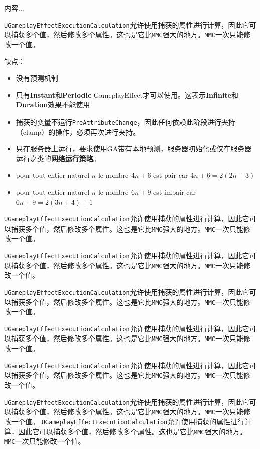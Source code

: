 \documentclass[10pt,a4paper,x11names,dvipsnames,svgnames,oneside]{ctexbook}
\begin{document}
\begin{expl}
	内容...

\texttt{UGameplayEffectExecutionCalculation}允许使用捕获的属性进行计算，因此它可以捕获多个值，然后修改多个属性。这也是它比\texttt{MMC}强大的地方。\texttt{MMC}一次只能修改一个值。

缺点：
\begin{itemize}
\item 没有预测机制
\item 只有\textbf{Instant}和\textbf{Periodic} GameplayEffect才可以使用。这表示\textbf{Infinite}和\textbf{Duration}效果不能使用
\item 捕获的变量不运行\texttt{PreAttributeChange}，因此任何依赖此阶段进行夹持（clamp）的操作，必须再次进行夹持。
\item 只在服务器上运行，要求使用GA带有本地预测，服务器初始化或仅在服务器运行之类的\textbf{网络运行策略}。
\end{itemize}

	\begin{itemize}
		\item  pour tout entier naturel $n$ le nombre $4n+6$ est pair car $4n+6=2(2n+3)$
		\item pour tout entier naturel $n$ le nombre $6n+9$ est impair car $6n+9=2(3n+4)+1$
	\end{itemize}
\texttt{UGameplayEffectExecutionCalculation}允许使用捕获的属性进行计算，因此它可以捕获多个值，然后修改多个属性。这也是它比\texttt{MMC}强大的地方。\texttt{MMC}一次只能修改一个值。


\texttt{UGameplayEffectExecutionCalculation}允许使用捕获的属性进行计算，因此它可以捕获多个值，然后修改多个属性。这也是它比\texttt{MMC}强大的地方。\texttt{MMC}一次只能修改一个值。


\texttt{UGameplayEffectExecutionCalculation}允许使用捕获的属性进行计算，因此它可以捕获多个值，然后修改多个属性。这也是它比\texttt{MMC}强大的地方。\texttt{MMC}一次只能修改一个值。


\texttt{UGameplayEffectExecutionCalculation}允许使用捕获的属性进行计算，因此它可以捕获多个值，然后修改多个属性。这也是它比\texttt{MMC}强大的地方。\texttt{MMC}一次只能修改一个值。


\texttt{UGameplayEffectExecutionCalculation}允许使用捕获的属性进行计算，因此它可以捕获多个值，然后修改多个属性。这也是它比\texttt{MMC}强大的地方。\texttt{MMC}一次只能修改一个值。


\texttt{UGameplayEffectExecutionCalculation}允许使用捕获的属性进行计算，因此它可以捕获多个值，然后修改多个属性。这也是它比\texttt{MMC}强大的地方。\texttt{MMC}一次只能修改一个值。	
\texttt{UGameplayEffectExecutionCalculation}允许使用捕获的属性进行计算，因此它可以捕获多个值，然后修改多个属性。这也是它比\texttt{MMC}强大的地方。\texttt{MMC}一次只能修改一个值。



\end{expl}
\end{document}
